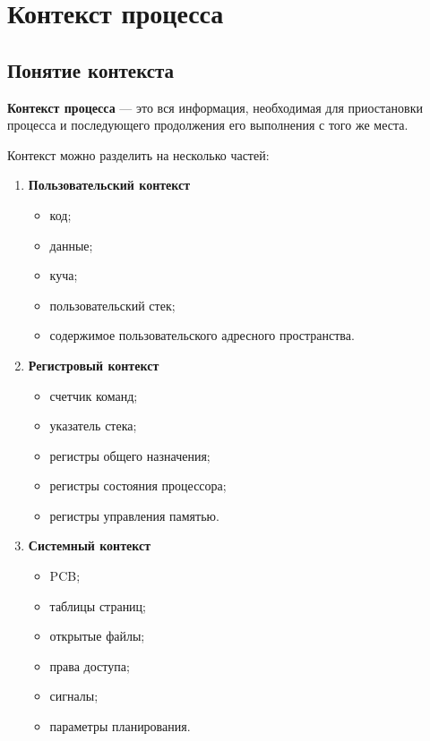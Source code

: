 \documentclass[12pt,a4paper]{article}
\begin{document}
\section{Контекст процесса}

\subsection{Понятие контекста}

\textbf{Контекст процесса} --- это вся информация, необходимая для приостановки процесса и последующего продолжения его выполнения с того же места.

Контекст можно разделить на несколько частей:

\begin{enumerate}
    \item \textbf{Пользовательский контекст}
    \begin{itemize}
        \item код;
        \item данные;
        \item куча;
        \item пользовательский стек;
        \item содержимое пользовательского адресного пространства.
    \end{itemize}

    \item \textbf{Регистровый контекст}
    \begin{itemize}
        \item счетчик команд;
        \item указатель стека;
        \item регистры общего назначения;
        \item регистры состояния процессора;
        \item регистры управления памятью.
    \end{itemize}

    \item \textbf{Системный контекст}
    \begin{itemize}
        \item PCB;
        \item таблицы страниц;
        \item открытые файлы;
        \item права доступа;
        \item сигналы;
        \item параметры планирования.
    \end{itemize}
\end{enumerate}
\end{document}
